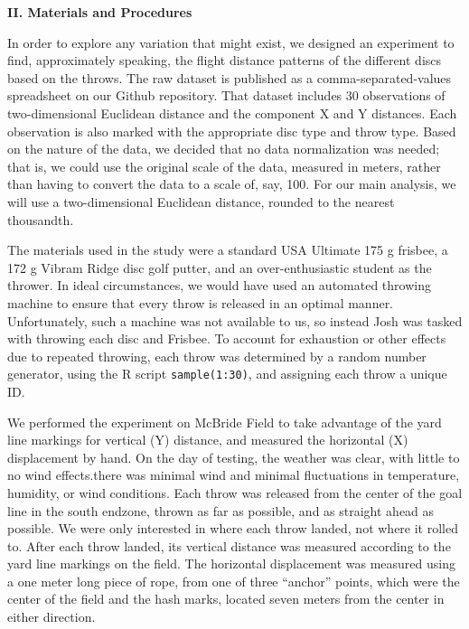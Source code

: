 \documentclass[letter,12pt]{article}
\begin{document}
	\begin{center}
		\textbf{II. Materials and Procedures}\par
	\end{center}
	\justify
	In order to explore any variation that might exist, we designed an experiment to find, approximately speaking, the flight distance patterns of the different discs based on the throws. The raw dataset is published as a comma-separated-values spreadsheet on our Github repository. That dataset includes 30 observations of two-dimensional Euclidean distance and the component X and Y distances. Each observation is also marked with the appropriate disc type and throw type. Based on the nature of the data, we decided that no data normalization was needed; that is, we could use the original scale of the data, measured in meters, rather than having to convert the data to a scale of, say, 100. For our main analysis, we will use a two-dimensional Euclidean distance, rounded to the nearest thousandth.\par
  The materials used in the study were a standard USA Ultimate 175 g frisbee, a 172 g Vibram Ridge disc golf putter, and an over-enthusiastic student as the thrower.  In ideal circumstances, we would have used an automated throwing machine to ensure that every throw is released in an optimal manner. Unfortunately, such a machine was not available to us, so instead Josh was tasked with throwing each disc and Frisbee. To account for exhaustion or other effects due to repeated throwing, each throw was determined by a random number generator, using the R script \verb|sample(1:30)|, and assigning each throw a unique ID.\par
  We performed the experiment on McBride Field to take advantage of the yard line markings for vertical (Y) distance, and measured the horizontal (X) displacement by hand. On the day of testing, the weather was clear, with little to no wind effects.there was minimal wind and minimal fluctuations in temperature, humidity, or wind conditions. Each throw was released from the center of the goal line in the south endzone, thrown as far as possible, and as straight ahead as possible. We were only interested in where each throw landed, not where it rolled to. After each throw landed, its vertical distance was measured according to the yard line markings on the field. The horizontal displacement was measured using a one meter long piece of rope, from one of three “anchor” points, which were the center of the field and the hash marks, located seven meters from the center in either direction.\par
\end{document}

